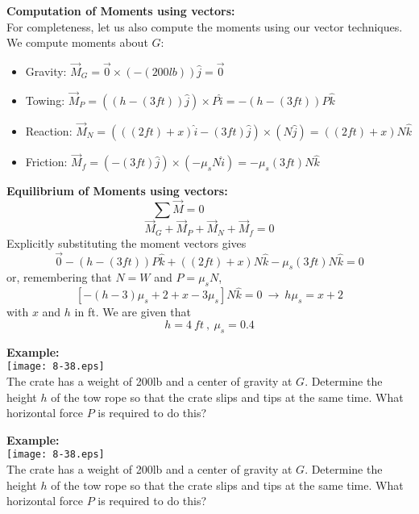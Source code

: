 \documentclass{seminar}
\begin{document}
\begin{slide}
{\bf \blue Computation of Moments using vectors:}\\
For completeness, let us also compute the moments using our
vector techniques. We compute moments about $G$:
\begin{itemize}
\item{}Gravity: $\vec M_G=\vec 0\times( -(200lb)) \hat j=\vec 0$
\item{}Towing:  $\vec M_P=((h-(3ft))\hat j)\times  P\hat i=-(h-(3ft))P\hat k$
\item{}Reaction: $\vec M_N=(((2ft)+x)\hat i - (3ft)\hat j)\times\left( N\hat j\right)
=((2ft)+x)N\hat k$
\item{}Friction: $\vec M_f=(-(3ft)\hat j)\times (-\mu_sN\hat i)=-\mu_s(3ft)N\hat k$
\end{itemize}
\vfill
\end{slide}







\begin{slide}
{\bf\blue Equilibrium of Moments using vectors:}
 $$\sum \vec M=0~~~~~~~~~~~~~~~~~~~~~~~~~$$
$$ \vec M_G + \vec M_P + \vec M_N + \vec M_f=0
$$
Explicitly substituting the moment vectors gives
$$
 \vec 0 -(h-(3ft))P\hat k+((2ft)+x)N \hat
 k   -\mu_s(3ft)N\hat k =0
$$
or, remembering that $N=W$ and $P=\mu_sN$, 
$$
[-(h-3)\mu_s +2+x-3\mu_s]N\hat k=0~\to~ h\mu_s=x+2
$$
with $x$ and $h$ in ft.  We are given that
$$
h=4~ft~,~\mu_s=0.4
$$
 \vfill
\end{slide}











\begin{slide}
{\bf\blue Example:}\\
\texttt{[image: 8-38.eps]}\\
The crate has a weight of 200lb and a center of
gravity at $G$. Determine the height $h$ of the tow rope so that the
crate slips and tips at the same time.  What horizontal force $P$ is
required to do this?
\vfill
\end{slide}










\begin{slide}
{\bf\blue Example:}\\
\texttt{[image: 8-38.eps]}\\
The crate has a weight of 200lb and a center of
gravity at $G$. Determine the height $h$ of the tow rope so that the
crate slips and tips at the same time.  What horizontal force $P$ is
required to do this?
\vfill
\end{slide}
\end{document}
